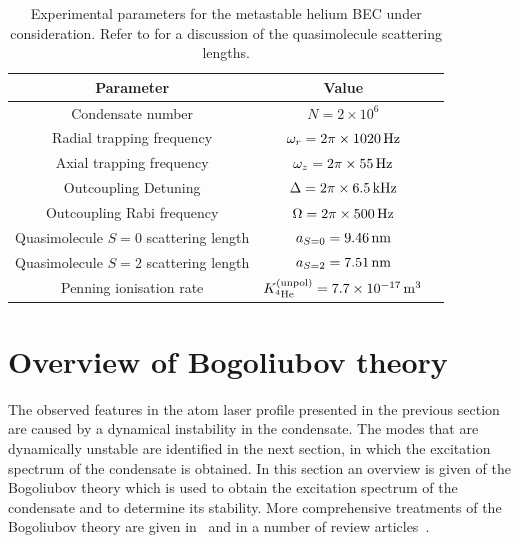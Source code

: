 \begin{table}
    \centering
    \begin{tabular}{ccc}
    \toprule
    Parameter & Value\\
    \midrule
    Condensate number & $N = 2\times 10^6$\\
    Radial trapping frequency & $\omega_r = 2 \pi \times \unit[1020]{Hz}$\\
    Axial trapping frequency & $\omega_z = 2\pi \times \unit[55]{Hz}$\\
    Outcoupling Detuning & $\Delta = 2\pi \times \unit[6.5]{kHz}$\\
    Outcoupling Rabi frequency & $\Omega = 2\pi \times \unit[500]{Hz}$\\
    Quasimolecule $S=0$ scattering length & $a_{S=0}=\unit[9.46]{nm}$\\
    Quasimolecule $S=2$ scattering length & $a_{S=2}=\unit[7.51]{nm}$\\
    Penning ionisation rate  & $\Kunpol = \unit[7.7\times 10^{-17}]{m\textsuperscript{3}}$ & \citep{Stas:2006kx}\\
    \bottomrule
    \end{tabular}
    \caption{Experimental parameters for the metastable helium BEC under consideration.  Refer to  for a discussion of the quasimolecule scattering lengths.}
    \label{Peaks:ExperimentalParameters}
\end{table}

\section{Overview of Bogoliubov theory}
\label{Peaks:ElementaryExcitations}

The observed features in the atom laser profile presented in the previous section are caused by a dynamical instability in the condensate. The modes that are dynamically unstable are identified in the next section, in which the excitation spectrum of the condensate is obtained. In this section an overview is given of the Bogoliubov theory which is used to obtain the excitation spectrum of the condensate and to determine its stability. More comprehensive treatments of the Bogoliubov theory are given in~\citep{PethickSmith} and in a number of review articles~\citep{Leggett:2001,Ozeri:2005,Proukakis:2008}.

